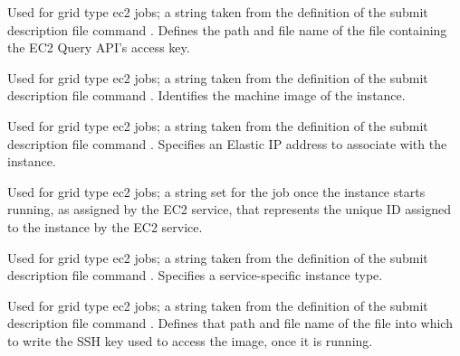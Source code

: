 \begin{description}
\item[\AdAttr{EC2AccessKeyId}:] 
Used for grid type ec2 jobs;
a string taken from the definition of the submit description file command
.
Defines the path and file name of the file containing the EC2 Query API's
access key.

\item[\AdAttr{EC2AmiID}:] 
Used for grid type ec2 jobs;
a string taken from the definition of the submit description file command
.
Identifies the machine image of the instance.

\item[\AdAttr{EC2ElasticIp}:] 
Used for grid type ec2 jobs;
a string taken from the definition of the submit description file command
.
Specifies an Elastic IP address to associate with the instance.

\item[\AdAttr{EC2InstanceName}:] 
Used for grid type ec2 jobs;
a string set for the job once the instance starts running, 
as assigned by the EC2 service, 
that represents the unique ID assigned to the instance by the EC2 service.

\item[\AdAttr{EC2InstanceType}:] 
Used for grid type ec2 jobs;
a string taken from the definition of the submit description file command
.
Specifies a service-specific instance type.

\item[\AdAttr{EC2KeyPairFile}:] 
Used for grid type ec2 jobs;
a string taken from the definition of the submit description file command
.
Defines that path and file name of the file 
into which to write the SSH key used to access the image, once it is running. 


\end{description}
